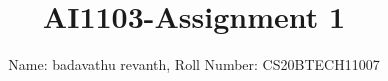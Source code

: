 \documentclass[journal,12pt,twocolumn]{IEEEtran}
\DeclareMathOperator*{\Res}{Res}
\begin{document}
\newcommand{\BEQA}{\begin{eqnarray}}
\newcommand{\EEQA}{\end{eqnarray}}
\newcommand{\define}{\stackrel{\triangle}{=}}

\raggedbottom
\setlength{\parindent}{0pt}
\providecommand{\mbf}{\mathbf}
\providecommand{\pr}[1]{\ensuremath{\Pr\left(#1\right)}}
\providecommand{\qfunc}[1]{\ensuremath{Q\left(#1\right)}}
\providecommand{\sbrak}[1]{\ensuremath{{}\left[#1\right]}}
\providecommand{\lsbrak}[1]{\ensuremath{{}\left[#1\right.}}
\providecommand{\rsbrak}[1]{\ensuremath{{}\left.#1\right]}}
\providecommand{\brak}[1]{\ensuremath{\left(#1\right)}}
\providecommand{\lbrak}[1]{\ensuremath{\left(#1\right.}}
\providecommand{\rbrak}[1]{\ensuremath{\left.#1\right)}}
\providecommand{\cbrak}[1]{\ensuremath{\left\{#1\right\}}}
\providecommand{\lcbrak}[1]{\ensuremath{\left\{#1\right.}}
\providecommand{\rcbrak}[1]{\ensuremath{\left.#1\right\}}}
\theoremstyle{remark}
\newtheorem{rem}{Remark}
\newcommand{\sgn}{\mathop{\mathrm{sgn}}}
\providecommand{\abs}[1]{\vert#1\vert}
\providecommand{\res}[1]{\Res\displaylimits_{#1}} 
\providecommand{\norm}[1]{\lVert#1\rVert}
\providecommand{\mtx}[1]{\mathbf{#1}}
\providecommand{\mean}[1]{E[ #1 ]}
\providecommand{\fourier}{\overset{\mathcal{F}}{ \rightleftharpoons}}
\providecommand{\system}{\overset{\mathcal{H}}{ \longleftrightarrow}}
\newcommand{\solution}{\noindent \textbf{Solution: }}
\newcommand{\cosec}{\,\text{cosec}\,}
\providecommand{\dec}[2]{\ensuremath{\overset{#1}{\underset{#2}{\gtrless}}}}
\newcommand{\myvec}[1]{\ensuremath{\begin{pmatrix}#1\end{pmatrix}}}
\newcommand{\mydet}[1]{\ensuremath{\begin{vmatrix}#1\end{vmatrix}}}
\makeatletter
{}
\makeatother
\let\StandardTheFigure\thefigure
\let\vec\mathbf
\renewcommand{\thefigure}{\theproblem}
\def\putbox#1#2#3{\makebox[0in][l]{\makebox[#1][l]{}\raisebox{\baselineskip}[0in][0in]{\raisebox{#2}[0in][0in]{#3}}}}
     \def\rightbox#1{\makebox[0in][r]{#1}}
     \def\centbox#1{\makebox[0in]{#1}}
     \def\topbox#1{\raisebox{-\baselineskip}[0in][0in]{#1}}
     \def\midbox#1{\raisebox{-0.5\baselineskip}[0in][0in]{#1}}
\vspace{3cm}
\title{AI1103-Assignment 1}
\author{Name: badavathu revanth, Roll Number: CS20BTECH11007}
\end{document}
